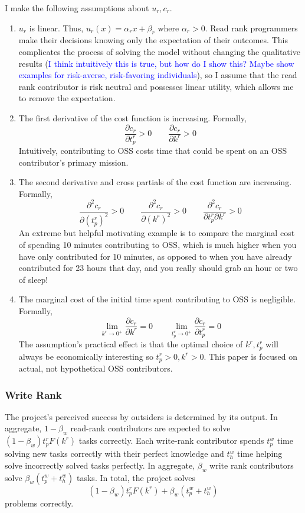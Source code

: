 \documentclass[12pt,notitlepage]{article}
\begin{document}
I make the following assumptions about $u_r, c_r$. 
\begin{enumerate}
    \item $u_r$ is linear. Thus, $u_r(x) = \alpha_r x + \beta_r$ where $\alpha_r > 0$. Read rank programmers make their decisions knowing only the expectation of their outcomes. This complicates the process of solving the model without changing the qualitative results (\textcolor{blue}{I think intuitively this is true, but how do I show this? Maybe show examples for risk-averse, risk-favoring individuals}), so I assume that the read rank contributor is risk neutral and possesses linear utility, which allows me to remove the expectation. 
    \item The first derivative of the cost function is increasing. Formally, 
    $$\frac{\partial c_r}{\partial t_p^r}>0 \qquad \frac{\partial c_r}{\partial k^r}>0$$
    Intuitively, contributing to OSS costs time that could be spent on an OSS contributor's primary mission. 
    \item The second derivative and cross partials of the cost function are increasing. Formally, $$\frac{\partial^2 c_r}{\partial (t_p^r)^2}>0 \qquad \frac{\partial^2 c_r}{\partial (k^r)^2}>0 \qquad \frac{\partial^2 c_r}{\partial t_p^r \partial k^r}>0$$
    An extreme but helpful motivating example is to compare the marginal cost of spending 10 minutes contributing to OSS, which is much higher when you have only contributed for 10 minutes, as opposed to when you have already contributed for 23 hours that day, and you really should grab an hour or two of sleep! 
    \item The marginal cost of the initial time spent contributing to OSS is negligible. Formally, $$\lim_{k^r \to 0^+} \frac{\partial c_r}{\partial k^r} = 0 \qquad  \lim_{t_p^r \to 0^+} \frac{\partial c_r}{\partial t_p^r} = 0$$
    The assumption's practical effect is that the optimal choice of $k^r, t_p^r$ will always be economically interesting so $t_p^r>0, k^r>0$. This paper is focused on actual, not hypothetical OSS contributors.
\end{enumerate}


\subsubsection{Write Rank}
The project's perceived success by outsiders is determined by its output. In aggregate, $1-\beta_w$ read-rank contributors are expected to solve $(1-\beta_w) t_p^rF(k^r)$ tasks correctly. Each write-rank contributor spends $t_p^w$ time solving new tasks correctly with their perfect knowledge and $t_h^w$ time helping solve incorrectly solved tasks perfectly. In aggregate, $\beta_w$ write rank contributors solve $\beta_w (t_p^w + t_h^w)$ tasks. In total, the project solves
$$(1-\beta_w) t_p^rF(k^r) + \beta_w (t_p^w + t_h^w)$$
problems correctly. 
\end{document}
